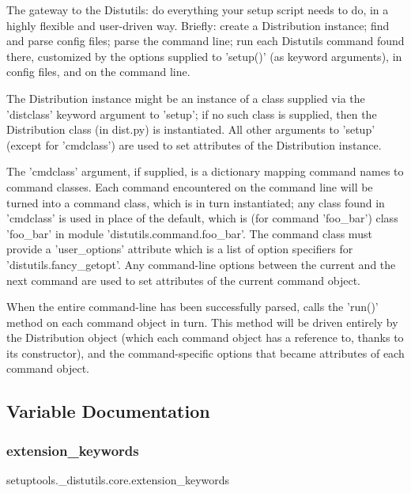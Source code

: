 \begin{DoxyVerb}The gateway to the Distutils: do everything your setup script needs
to do, in a highly flexible and user-driven way.  Briefly: create a
Distribution instance; find and parse config files; parse the command
line; run each Distutils command found there, customized by the options
supplied to 'setup()' (as keyword arguments), in config files, and on
the command line.

The Distribution instance might be an instance of a class supplied via
the 'distclass' keyword argument to 'setup'; if no such class is
supplied, then the Distribution class (in dist.py) is instantiated.
All other arguments to 'setup' (except for 'cmdclass') are used to set
attributes of the Distribution instance.

The 'cmdclass' argument, if supplied, is a dictionary mapping command
names to command classes.  Each command encountered on the command line
will be turned into a command class, which is in turn instantiated; any
class found in 'cmdclass' is used in place of the default, which is
(for command 'foo_bar') class 'foo_bar' in module
'distutils.command.foo_bar'.  The command class must provide a
'user_options' attribute which is a list of option specifiers for
'distutils.fancy_getopt'.  Any command-line options between the current
and the next command are used to set attributes of the current command
object.

When the entire command-line has been successfully parsed, calls the
'run()' method on each command object in turn.  This method will be
driven entirely by the Distribution object (which each command object
has a reference to, thanks to its constructor), and the
command-specific options that became attributes of each command
object.
\end{DoxyVerb}
 

\subsection{Variable Documentation}
\mbox{\label{namespacesetuptools_1_1__distutils_1_1core_aff7fc83db6e6430d082c69c85493baf9}} 
\subsubsection{\texorpdfstring{extension\+\_\+keywords}{extension\_keywords}}
{\footnotesize\ttfamily setuptools.\+\_\+distutils.\+core.\+extension\+\_\+keywords}

